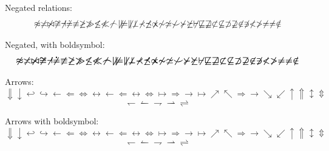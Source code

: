 \documentclass[12pt,a4paper]{article}
\theoremstyle{clearprint}
\begin{document}
\noindent 
Negated relations:
\begin{equation}
\not\approx \not\asymp \not\bowtie \not\cong \not\dashv \not\doteq \not\equiv \not\geq \not\gg \not\leq \not\ll \not\frown \not\mid \not\models \not\parallel \not\perp \not\prec \not\preceq \not\propto \not\sim \not\simeq \not\smile \not\succ \not\succeq \not\vdash
\not\sqsubseteq \not\sqsupseteq \not\subset \not\subseteq \not\supset \not\supseteq \not\in \not\ni
\not< \not> \not= \neq \notin
\end{equation}

\noindent 
Negated, with boldsymbol:
\begin{equation}
\boldsymbol{\not\approx \not\asymp \not\bowtie \not\cong \not\dashv \not\doteq \not\equiv \not\geq \not\gg \not\leq \not\ll \not\frown \not\mid \not\models \not\parallel \not\perp \not\prec \not\preceq \not\propto \not\sim \not\simeq \not\smile \not\succ \not\succeq \not\vdash
\not\sqsubseteq \not\sqsupseteq \not\subset \not\subseteq \not\supset \not\supseteq \not\in \not\ni
\not< \not> \not= \neq \notin}
\end{equation}

\noindent
Arrows: %
\begin{equation}
\Downarrow \downarrow \hookleftarrow \hookrightarrow \leftarrow \Leftarrow \Leftrightarrow \leftrightarrow \longleftarrow \Longleftarrow \longleftrightarrow \Longleftrightarrow \longmapsto \Longrightarrow \longrightarrow \mapsto \nearrow \nwarrow \Rightarrow \rightarrow \searrow \swarrow \uparrow \Uparrow \updownarrow \Updownarrow
\end{equation}
\begin{equation}
\leftharpoondown \leftharpoonup \rightharpoondown \rightharpoonup \rightleftharpoons
\end{equation}

\noindent 
Arrows with boldsymbol:
\begin{equation}
\boldsymbol{\Downarrow \downarrow \hookleftarrow \hookrightarrow \leftarrow \Leftarrow \Leftrightarrow \leftrightarrow \longleftarrow \Longleftarrow \longleftrightarrow \Longleftrightarrow \longmapsto \Longrightarrow \longrightarrow \mapsto \nearrow \nwarrow \Rightarrow \rightarrow \searrow \swarrow \uparrow \Uparrow \updownarrow \Updownarrow}
\end{equation}
\begin{equation}
\boldsymbol{
\leftharpoondown \leftharpoonup \rightharpoondown \rightharpoonup \rightleftharpoons} 
\end{equation}
\end{document}
